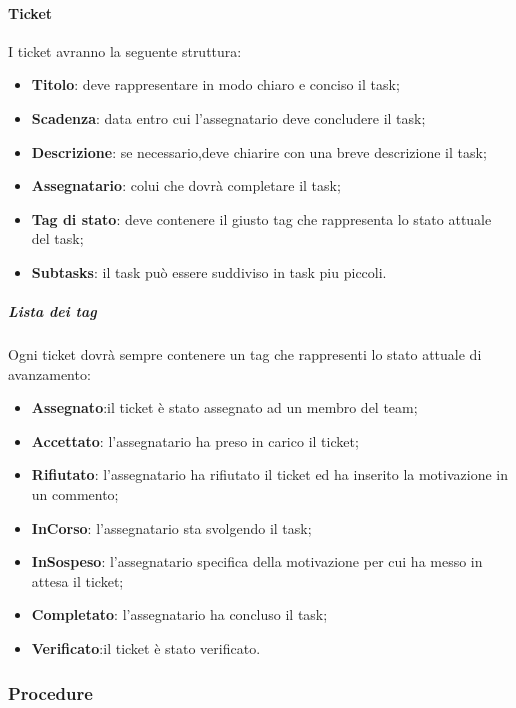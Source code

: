 	\paragraph{Ticket}
	 I ticket avranno la seguente struttura:
	 \begin{itemize}
	 	\item \textbf{Titolo}: deve rappresentare in modo chiaro e conciso il task;
	 	\item \textbf{Scadenza}: data entro cui l'assegnatario deve concludere il task;
	 	\item \textbf{Descrizione}: se necessario,deve chiarire con una breve descrizione il task;
	 	\item \textbf{Assegnatario}: colui che dovrà completare il task;
	 	\item \textbf{Tag di stato}: deve contenere il giusto tag che rappresenta lo stato attuale del task; 
	 	\item \textbf{Subtasks}: il task può essere suddiviso in task piu piccoli.
	 	\end{itemize}
	 	\subparagraph{Lista dei tag}
	 	Ogni ticket dovrà sempre contenere un tag che rappresenti lo stato attuale di avanzamento:
	 	\begin{itemize}
	 		\item \textbf{Assegnato}:il ticket è stato assegnato ad un membro del team;
	 		\item \textbf{Accettato}: l'assegnatario ha preso in carico il ticket;
	 		\item \textbf{Rifiutato}: l'assegnatario ha rifiutato il ticket ed ha inserito la motivazione in un commento;
	 		\item \textbf{InCorso}: l'assegnatario sta svolgendo il task;
	 		\item \textbf{InSospeso}: l'assegnatario specifica della motivazione per cui ha messo in attesa il ticket;
	 		\item \textbf{Completato}: l'assegnatario ha concluso il task;
	 		\item \textbf{Verificato}:il ticket è stato verificato.
	 		\end{itemize}
\subsubsection{Procedure}
